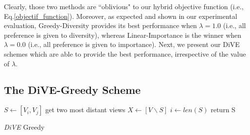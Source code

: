 Clearly, those two methods are ``oblivious" to our hybrid objective function (i.e., Eq.\ref{objectif_function}). 
%
%
Moreover, as expected and shown in our experimental evaluation, Greedy-Diversity provides its best performance when $\lambda=1.0$ (i.e., all preference is given to diversity), whereas Linear-Importance is the winner when $\lambda=0.0$ (i.e., all preference is given to importance). 
%
Next, we present our DiVE schemes which are able to provide the best performance, irrespective of the value of $\lambda$.



\subsection{The DiVE-Greedy Scheme}\label{subsec:dive-greedy}

\setlength{\textfloatsep}{0pt}%
\begin{algorithm}[t]
	\SetAlgoLined
	$S \leftarrow \left[V_i, V_j\right] $ get  two most distant views\;
	$X \leftarrow  \left[V \backslash S\right]$\;
	$i \leftarrow len\left(S\right) $\;
	return S
	\caption{\textit{DiVE} Greedy}
	\label{DiVE-Greedy}
\end{algorithm}

